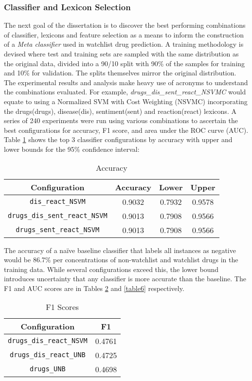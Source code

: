 \documentclass[twoside,11pt]{article}
\begin{document}
\subsubsection{Classifier and Lexicon Selection}
The next goal of the dissertation is to discover the best performing combinations of classifier, lexicons and feature selection as a means to inform the construction of a \textit{Meta classifier} used in watchlist drug prediction. A training methodology is devised where test and training sets are sampled with the same distribution as the original data, divided into a 90/10 split with 90\% of the samples for training and 10\% for validation. The splits themselves mirror the original distribution.
The experimental results and analysis make heavy use of acronyms to understand the combinations evaluated. For example, \textit{drugs\_dis\_sent\_react\_NSVMC} would equate to using a Normalized SVM with Cost Weighting (NSVMC) incorporating the drugs(drugs), disease(dis), sentiment(sent) and reaction(react) lexicons. A series of 240 experiments were run using various combinations to ascertain the best configurations for accuracy, F1 score, and area under the ROC curve (AUC). Table \ref{table4} shows the top 3 classifier configurations by accuracy with upper and lower bounds for the 95\% confidence interval:
\begin{table}[H]
  \centering
  \caption{Accuracy}
  \label{table4}
  \begin{tabular}{||c|c|c|c||}
    \hline
    Configuration & Accuracy & Lower & Upper \\
    \hline\hline
    \verb|dis_react_NSVM| & 0.9032 & 0.7932 & 0.9578 \\
    \hline
    \verb|drugs_dis_sent_react_NSVM| & 0.9013 & 0.7908 & 0.9566 \\
    \hline
    \verb|drugs_sent_react_NSVM| & 0.9013 & 0.7908 & 0.9566 \\
    \hline
  \end{tabular}
\end{table}
The accuracy of a na\"ive baseline classifier that labels all instances as negative would be 86.7\% per concentrations of non-watchlist and watchlist drugs in the training data. While several configurations exceed this, the lower bound introduces uncertainty that any classifier is more accurate than the baseline. The F1 and AUC scores are in Tables \ref{table5} and \ref{table6} respectively.\\
\begin{minipage}{.6\textwidth}
  \begin{table}[H]
    \caption{F1 Scores}
    \label{table5}
    \begin{tabular}{||c|c||}
      \hline
      Configuration & F1 \\
      \hline\hline
      \verb|drugs_dis_react_NSVM| & 0.4761 \\
      \hline
      \verb|drugs_dis_react_UNB| & 0.4725 \\
      \hline
      \verb|drugs_UNB| & 0.4698 \\
      \hline
    \end{tabular}
  \end{table}
\end{minipage}
\end{document}
